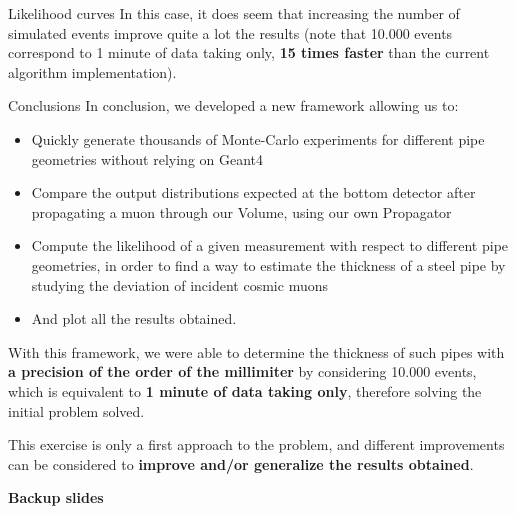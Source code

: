 \documentclass[handout,8 pt]{beamer}
\newcommand{\backupbegin}{
   \newcounter{finalframe}
   \setcounter{finalframe}{\value{framenumber}}
}
\begin{document}
\begin{frame}{Likelihood curves}
In this case, it does seem that increasing the number of simulated events improve quite a lot the results (note that 10.000 events correspond to 1 minute of data taking only, \textbf{15 times faster} than the current algorithm implementation). \vfill
\end{frame}










\begin{frame}{Conclusions}
\justifying
In conclusion, we developed a new framework allowing us to:
\begin{itemize}
\justifying
\item Quickly generate thousands of Monte-Carlo experiments for different pipe geometries without relying on Geant4
\item Compare the output distributions expected at the bottom detector after propagating a muon through our Volume, using our own Propagator
\item Compute the likelihood of a given measurement with respect to different pipe geometries, in order to find a way to estimate the thickness of a steel pipe by studying the deviation of incident cosmic muons
\item And plot all the results obtained.
\end{itemize} \vfill

\begin{exampleblock}{}
\justifying
With this framework, we were able to determine the thickness of such pipes with \textbf{a precision of the order of the millimiter} by considering 10.000 events, which is equivalent to \textbf{1 minute of data taking only}, therefore solving the initial problem solved. 
\end{exampleblock} \vfill

This exercise is only a first approach to the problem, and different improvements can be considered to \textbf{improve and/or generalize the results obtained}. \vfill
\end{frame}








\appendix
	\backupbegin

\begin{frame}{}
	\centering
	\huge{\textbf{\color{mycolor}Backup slides  \color{black}}} \newline
\end{frame}
	
\end{document}
